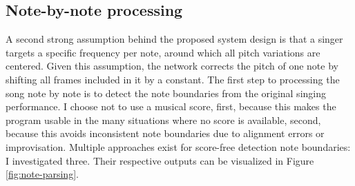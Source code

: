 \subsection{Note-by-note processing}
\label{sec:notes}
A second strong assumption behind the proposed system design is that a singer targets a specific frequency per note, around which all pitch variations are centered. Given this assumption, the network corrects the pitch of one note by shifting all frames included in it by a constant. The first step to processing the song note by note is to detect the note boundaries from the original singing performance. I choose not to use a musical score, first, because this makes the program usable in the many situations where no score is available, second, because this avoids inconsistent note boundaries due to alignment errors or improvisation. Multiple approaches exist for score-free detection note boundaries: I investigated three. Their respective outputs can be visualized in Figure \ref{fig:note-parsing}.


